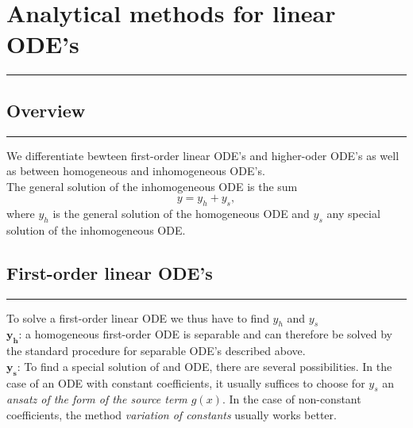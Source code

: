 \section{Analytical methods for linear ODE’s}
\noindent\rule[\linienAbstand]{\linewidth}{\linienDickeDick}

\subsection{Overview}
\noindent\rule[\linienAbstand]{\linewidth}{\linienDicke}
We differentiate bewteen first-order linear ODE's and higher-oder ODE's as well as between homogeneous and inhomogeneous ODE's.\\

The general solution of the inhomogeneous ODE is the sum
\begin{equation}
  y = y_h + y_s,
  \label{eq:2.50}
\end{equation}
where $y_h$ is the general solution of the homogeneous ODE and $y_s$ any special solution of the inhomogeneous ODE.

\subsection{First-order linear ODE's}
\noindent\rule[\linienAbstand]{\linewidth}{\linienDicke}
To solve a first-order linear ODE we thus have to find $y_h$ and $y_s$\\
$\mathbf{y_h}$: a homogeneous first-order ODE is separable and can therefore be solved by the standard procedure for separable ODE’s described above.\\
$\mathbf{y_s}$: To find a special solution of and ODE, there are several possibilities. In the case of an ODE with constant coefficients, it usually suffices to choose for $y_s$ an \emph{ansatz of the form of the source term $g(x)$}. In the case of non-constant coefficients, the method \emph{variation of constants} usually works better.\\


